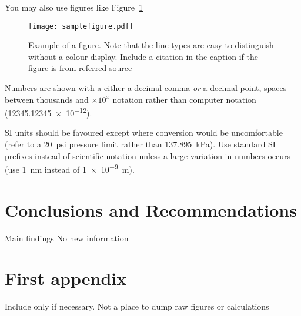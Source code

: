 \documentclass[a4paper,12pt]{article}
\begin{document}
You may also use figures like Figure~\ref{fig:samplefigure}

\begin{figure}[htbp]
  \centering
  \texttt{[image: samplefigure.pdf]}
  \caption[Short caption which will be in the table of figures]{Example of a figure.  Note that the line types are easy to
    distinguish without a colour display.  Include a citation in the caption if the figure is from referred source}
  \label{fig:samplefigure}
\end{figure}

Numbers are shown with a either a decimal comma \emph{or} a decimal point, spaces between thousands and $\times 10^x$ notation rather than computer notation (\num{12345.12345e-12}).

SI units should be favoured except where conversion would be
uncomfortable (refer to a \SI{20}{psi} pressure limit rather than
\SI{137.895}{\kilo\pascal}).
Use standard
SI prefixes instead of scientific notation unless a large variation in
numbers occurs (use \SI{1}{\nano\meter} instead of \SI{1e-9}{\meter}).

\section{Conclusions and Recommendations}
Main findings
No new information




\appendix
\renewcommand{\thefigure}{\thesection.\arabic{figure}}
\renewcommand{\thepage}{\thesection.\arabic{page}}
\section{First appendix}
\setcounter{figure}{0}
\setcounter{page}{1}
Include only if necessary. Not a place to dump raw figures or calculations
\end{document}
